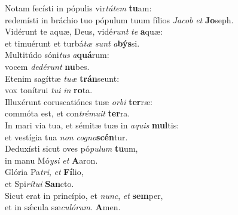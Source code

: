\evenverse Notam fecísti in pópulis vir\textit{tú}\textit{tem} \textbf{tu}am:~\*\\
\evenverse redemísti in bráchio tuo pópulum tuum fílios \textit{Ja}\textit{cob} \textit{et} \textbf{Jo}seph.\\
\oddverse Vidérunt te aquæ, Deus, vidé\textit{runt} \textit{te} \textbf{a}quæ:~\*\\
\oddverse et timuérunt et turbá\textit{tæ} \textit{sunt} \textit{a}\textbf{býs}si.\\
\evenverse Multitúdo sóni\textit{tus} \textit{a}\textbf{quá}rum:~\*\\
\evenverse vocem \textit{de}\textit{dé}\textit{runt} \textbf{nu}bes.\\
\oddverse Etenim sagíttæ \textit{tu}\textit{æ} \textbf{trán}seunt:~\*\\
\oddverse vox tonítrui \textit{tu}\textit{i} \textit{in} \textbf{ro}ta.\\
\evenverse Illuxérunt coruscatiónes tuæ \textit{or}\textit{bi} \textbf{ter}ræ:~\*\\
\evenverse commóta est, et con\textit{tré}\textit{mu}\textit{it} \textbf{ter}ra.\\
\oddverse In mari via tua, et sémitæ tuæ in \textit{a}\textit{quis} \textbf{mul}tis:~\*\\
\oddverse et vestígia tua \textit{non} \textit{co}\textit{gno}\textbf{scén}tur.\\
\evenverse Deduxísti sicut oves pó\textit{pu}\textit{lum} \textbf{tu}um,~\*\\
\evenverse in manu Mó\textit{y}\textit{si} \textit{et} \textbf{A}aron.\\
\oddverse Glória Pa\textit{tri}, \textit{et} \textbf{Fí}lio,~\*\\
\oddverse et Spi\textit{rí}\textit{tu}\textit{i} \textbf{San}cto.\\
\evenverse Sicut erat in princípio, et \textit{nunc}, \textit{et} \textbf{sem}per,~\*\\
\evenverse et in sǽcula sæ\textit{cu}\textit{ló}\textit{rum}. \textbf{A}men.\\
